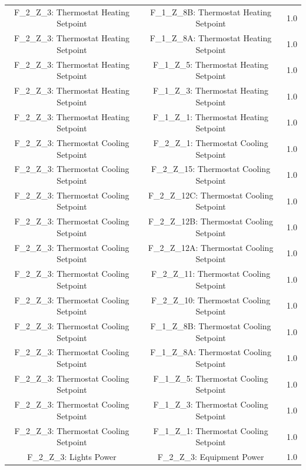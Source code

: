 \documentclass[aps, 10pt, a4paper]{article}
\begin{document}
\begin{longtable}{c|c||c}
                    F\_2\_Z\_3: Thermostat Heating Setpoint & F\_1\_Z\_8B: Thermostat Heating Setpoint & 1.0 \\
                    F\_2\_Z\_3: Thermostat Heating Setpoint & F\_1\_Z\_8A: Thermostat Heating Setpoint & 1.0 \\
                    F\_2\_Z\_3: Thermostat Heating Setpoint & F\_1\_Z\_5: Thermostat Heating Setpoint & 1.0 \\
                    F\_2\_Z\_3: Thermostat Heating Setpoint & F\_1\_Z\_3: Thermostat Heating Setpoint & 1.0 \\
                    F\_2\_Z\_3: Thermostat Heating Setpoint & F\_1\_Z\_1: Thermostat Heating Setpoint & 1.0 \\
                    F\_2\_Z\_3: Thermostat Cooling Setpoint & F\_2\_Z\_1: Thermostat Cooling Setpoint & 1.0 \\
                    F\_2\_Z\_3: Thermostat Cooling Setpoint & F\_2\_Z\_15: Thermostat Cooling Setpoint & 1.0 \\
                    F\_2\_Z\_3: Thermostat Cooling Setpoint & F\_2\_Z\_12C: Thermostat Cooling Setpoint & 1.0 \\
                    F\_2\_Z\_3: Thermostat Cooling Setpoint & F\_2\_Z\_12B: Thermostat Cooling Setpoint & 1.0 \\
                    F\_2\_Z\_3: Thermostat Cooling Setpoint & F\_2\_Z\_12A: Thermostat Cooling Setpoint & 1.0 \\
                    F\_2\_Z\_3: Thermostat Cooling Setpoint & F\_2\_Z\_11: Thermostat Cooling Setpoint & 1.0 \\
                    F\_2\_Z\_3: Thermostat Cooling Setpoint & F\_2\_Z\_10: Thermostat Cooling Setpoint & 1.0 \\
                    F\_2\_Z\_3: Thermostat Cooling Setpoint & F\_1\_Z\_8B: Thermostat Cooling Setpoint & 1.0 \\
                    F\_2\_Z\_3: Thermostat Cooling Setpoint & F\_1\_Z\_8A: Thermostat Cooling Setpoint & 1.0 \\
                    F\_2\_Z\_3: Thermostat Cooling Setpoint & F\_1\_Z\_5: Thermostat Cooling Setpoint & 1.0 \\
                    F\_2\_Z\_3: Thermostat Cooling Setpoint & F\_1\_Z\_3: Thermostat Cooling Setpoint & 1.0 \\
                    F\_2\_Z\_3: Thermostat Cooling Setpoint & F\_1\_Z\_1: Thermostat Cooling Setpoint & 1.0 \\
                    F\_2\_Z\_3: Lights Power & F\_2\_Z\_3: Equipment Power & 1.0 \\

\end{longtable}
\end{document}
